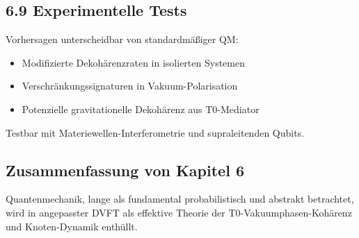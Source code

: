 	\begin{table}[htbp]
		\centering
		\caption{Quanteninterpretation-Vergleich}
		\label{tab:quanten}
	\end{table}
	
	\subsection{6.9 Experimentelle Tests}
	
	Vorhersagen unterscheidbar von standardmäßiger QM:
	\begin{itemize}
		\item Modifizierte Dekohärenzraten in isolierten Systemen
		\item Verschränkungssignaturen in Vakuum-Polarisation
		\item Potenzielle gravitationelle Dekohärenz aus T0-Mediator
	\end{itemize}
	
	Testbar mit Materiewellen-Interferometrie und supraleitenden Qubits.
	
	\subsection{Zusammenfassung von Kapitel 6}
	
	Quantenmechanik, lange als fundamental probabilistisch und abstrakt betrachtet, wird in angepasster DVFT als effektive Theorie der T0-Vakuumphasen-Kohärenz und Knoten-Dynamik enthüllt.
	
